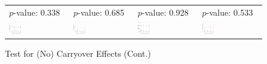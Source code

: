 \documentclass[12pt]{article}
\begin{document}
\begin{figure}[!ht]
  \caption{Test for (No) Carryover Effects (Cont.)}
  \centering\scriptsize
  \begin{minipage}{1\linewidth}{
  \centering
  \hspace{1.5em}
  \begin{tabular}{C{3.7cm}C{3.7cm}C{3.7cm}C{3.7cm}}
     \citet{Payson2020apsr}\newline $p$-value: 0.338 &
     \citet{Pierskalla2018} \newline $p$-value: 0.685 &
     \citet{Schafer2021} \newline $p$-value: 0.928  &
      \citet{Schuit2017}\newline $p$-value: 0.533\\
    \hspace{-2em} \includegraphics[width = 0.22\textwidth]{figure/carryover/paysona_carryover.png} & 
    \hspace{-2em}  \includegraphics[width = 0.22\textwidth]{figure/carryover/Pierskalla_carryover.png} & 
    \hspace{-2em}  \includegraphics[width = 0.22\textwidth]{figure/carryover/schafer_carryover.png} &
       \hspace{-2em}  \includegraphics[width = 0.22\textwidth]{figure/carryover/Schuit_carryover.png}\\ 

\end{tabular}}
\end{minipage}
\end{figure}
\end{document}
